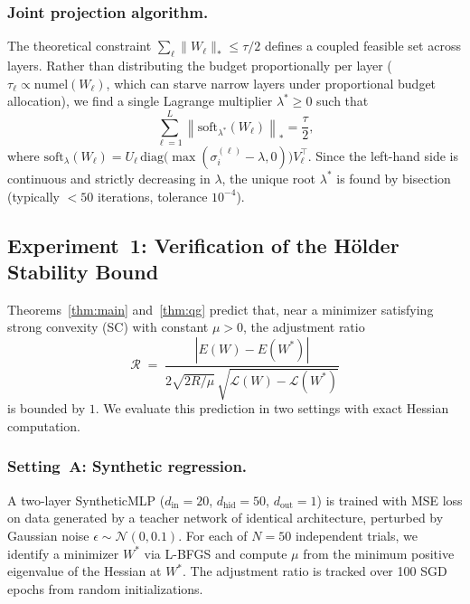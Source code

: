 \documentclass[a4paper,fleqn]{cas-sc}
\theoremstyle{remark}
\theoremstyle{definition}
\begin{document}
\subsubsection{Joint projection algorithm.}\label{sec:joint_proj}
The theoretical constraint $\sum_\ell\|W_\ell\|_*\le\tau/2$ defines a coupled feasible set across layers. Rather than distributing the budget proportionally per layer ($\tau_\ell\propto\mathrm{numel}(W_\ell)$, which can starve narrow layers under proportional budget allocation), we find a single Lagrange multiplier $\lambda^*\ge 0$ such that
\begin{equation}\label{eq:joint_proj}
    \sum_{\ell=1}^{L} \left\| \mathrm{soft}_{\lambda^*}(W_\ell) \right\|_* = \frac{\tau}{2},
\end{equation}
where $\mathrm{soft}_\lambda(W_\ell)=U_\ell\,\mathrm{diag}\!\big(\max(\sigma_i^{(\ell)}-\lambda,0)\big)V_\ell^\top$. Since the left-hand side is continuous and strictly decreasing in $\lambda$, the unique root $\lambda^*$ is found by bisection (typically $<50$ iterations, tolerance $10^{-4}$).


\subsection{Experiment~1: Verification of the Hölder Stability Bound}\label{sec:exp_holder}

Theorems~\ref{thm:main} and~\ref{thm:qg} predict that, near a minimizer satisfying strong convexity (SC) with constant $\mu>0$, the adjustment ratio
\[
    \mathcal{R} \;=\; \frac{|E(W)-E(W^*)|}{2\sqrt{2R/\mu}\,\sqrt{\mathcal{L}(W)-\mathcal{L}(W^*)}}
\]
is bounded by $1$. We evaluate this prediction in two settings with exact Hessian computation.

\subsubsection{Setting~A: Synthetic regression.}
A two-layer SyntheticMLP ($d_{\mathrm{in}}=20$, $d_{\mathrm{hid}}=50$, $d_{\mathrm{out}}=1$) is trained with MSE loss on data generated by a teacher network of identical architecture, perturbed by Gaussian noise $\epsilon\sim\mathcal{N}(0,0.1)$. For each of $N=50$ independent trials, we identify a minimizer $W^*$ via L-BFGS and compute $\mu$ from the minimum positive eigenvalue of the Hessian at $W^*$. The adjustment ratio is tracked over 100 SGD epochs from random initializations.
\end{document}
